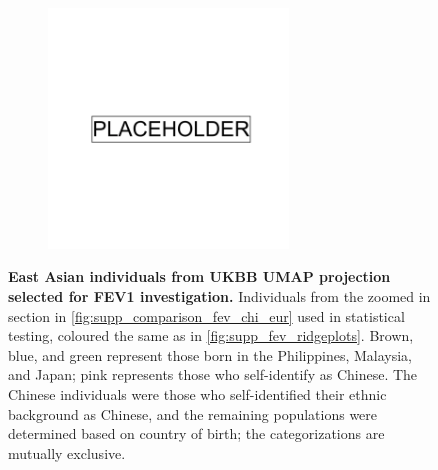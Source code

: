 \begin{figure}[ht]
    \centering
    \begin{subfigure}{0.5\textwidth}
    \includegraphics[width=0.7\textwidth]{placeholder.png}
    \end{subfigure}
    \caption[East Asian individuals from UKBB UMAP projection selected for FEV1 investigation]{\textbf{East Asian individuals from UKBB UMAP projection selected for FEV1 investigation.} Individuals from the zoomed in section in \ref{fig:supp_comparison_fev_chi_eur} used in statistical testing, coloured the same as in \ref{fig:supp_fev_ridgeplots}. Brown, blue, and green represent those born in the Philippines, Malaysia, and Japan; pink represents those who self-identify as Chinese. The Chinese individuals were those who self-identified their ethnic background as Chinese, and the remaining populations were determined based on country of birth; the categorizations are mutually exclusive.}
    \label{fig:supp_fev_test_pops}
\end{figure}

\newpage

